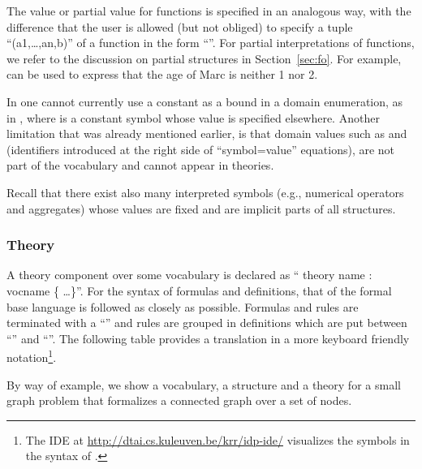 The value or partial value for functions is specified in an analogous way, with the difference that the user is allowed (but not obliged) to specify a tuple ``{(a1,\dots,an,b)}'' of a function in the form ``''. For partial interpretations of functions, we refer to the discussion on partial
structures in Section~\ref{sec:fo}. For example,  can be used to express that the age of Marc is neither 1 nor 2.

In \idp one cannot currently use a constant as a bound in a domain
enumeration, as in  , where  is a constant symbol whose value is specified elsewhere. Another limitation that was already mentioned earlier, is that domain values such as  and   (identifiers introduced at the right side of ``symbol=value'' equations), are not part of the vocabulary and cannot appear in theories. 

Recall that there exist also many interpreted symbols (e.g., numerical operators and aggregates) whose values are fixed and are implicit parts of all structures. 

\subsubsection{Theory} A theory  component over some vocabulary is  declared  as `` theory name : vocname \{ \dots \}''. For the syntax of formulas and definitions, that of
the formal base language is followed as closely as possible. Formulas
and rules are terminated with a ``'' and rules are grouped in
definitions which are put between ``'' and ``\il{\}}''.
The following table provides a translation in a more keyboard
friendly notation\footnote{The IDE at \url{http://dtai.cs.kuleuven.be/krr/idp-ide/} visualizes the symbols in the
  syntax of \foidaggpft.}.









By way of example, we show a vocabulary, a structure and a theory for
a small graph problem that formalizes a connected graph over a set of
nodes. 


